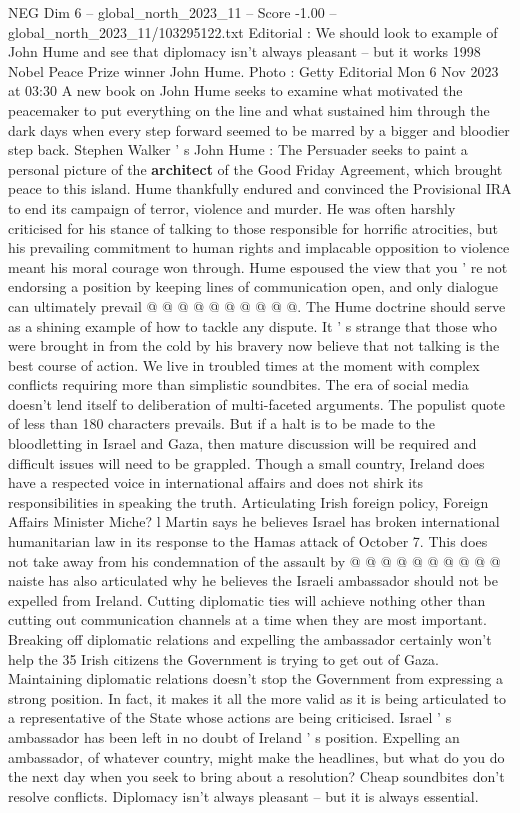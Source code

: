 \begin{textsample}{NEG Dim 6 – global\_north\_2023\_11 – Score -1.00 – global\_north\_2023\_11/103295122.txt}  \label{ex:f6_neg_227}
Editorial : We should look to example of John Hume and see that diplomacy isn't always pleasant -- but it works 1998 Nobel Peace Prize winner John Hume.
Photo : Getty Editorial Mon 6 Nov 2023 at 03:30 A new book on John Hume seeks to examine what motivated the peacemaker to put everything on the line and what sustained him through the dark days when every step forward seemed to be marred by a bigger and bloodier step back.
Stephen Walker ' s John Hume : The Persuader seeks to paint a personal picture of the \textbf{architect} of the Good Friday Agreement, which brought peace to this island.
Hume thankfully endured and convinced the Provisional IRA to end its campaign of terror, violence and murder.
He was often harshly criticised for his stance of talking to those responsible for horrific atrocities, but his prevailing commitment to human rights and implacable opposition to violence meant his moral courage won through.
Hume espoused the view that you ' re not endorsing a position by keeping lines of communication open, and only dialogue can ultimately prevail @ @ @ @ @ @ @ @ @ @.
The Hume doctrine should serve as a shining example of how to tackle any dispute.
It ' s strange that those who were brought in from the cold by his bravery now believe that not talking is the best course of action.
We live in troubled times at the moment with complex conflicts requiring more than simplistic soundbites.
The era of social media doesn't lend itself to deliberation of multi-faceted arguments.
The populist quote of less than 180 characters prevails.
But if a halt is to be made to the bloodletting in Israel and Gaza, then mature discussion will be required and difficult issues will need to be grappled.
Though a small country, Ireland does have a respected voice in international affairs and does not shirk its responsibilities in speaking the truth.
Articulating Irish foreign policy, Foreign Affairs Minister Miche? l Martin says he believes Israel has broken international humanitarian law in its response to the Hamas attack of October 7.
This does not take away from his condemnation of the assault by @ @ @ @ @ @ @ @ @ @ naiste has also articulated why he believes the Israeli ambassador should not be expelled from Ireland.
Cutting diplomatic ties will achieve nothing other than cutting out communication channels at a time when they are most important.
Breaking off diplomatic relations and expelling the ambassador certainly won't help the 35 Irish citizens the Government is trying to get out of Gaza.
Maintaining diplomatic relations doesn't stop the Government from expressing a strong position.
In fact, it makes it all the more valid as it is being articulated to a representative of the State whose actions are being criticised.
Israel ' s ambassador has been left in no doubt of Ireland ' s position.
Expelling an ambassador, of whatever country, might make the headlines, but what do you do the next day when you seek to bring about a resolution?
Cheap soundbites don't resolve conflicts.
Diplomacy isn't always pleasant -- but it is always essential.

\end{textsample}
